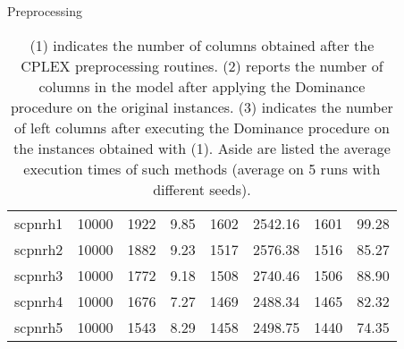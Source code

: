 \documentclass[a4paper,12pt]{mydeitesi_eng}
\begin{document}
\begin{chapter}{Preprocessing}
\begin{table}[H]
\begin{center}
\begin{tabular}{l|r||r|r||r|r||r|r}
scpnrh1 & 10000 & 1922 & 9.85 & 1602 & 2542.16 & 1601 & 99.28 \\
scpnrh2 & 10000 & 1882 & 9.23 & 1517 & 2576.38 & 1516 & 85.27 \\
scpnrh3 & 10000 & 1772 & 9.18 & 1508 & 2740.46 & 1506 & 88.90 \\
scpnrh4 & 10000 & 1676 & 7.27 & 1469 & 2488.34 & 1465 & 82.32 \\
scpnrh5 & 10000 & 1543 & 8.29 & 1458 & 2498.75 & 1440 & 74.35 \\
\end{tabular}
\end{center}
\caption{(1) indicates the number of columns obtained after the CPLEX preprocessing routines. (2) reports the number of columns in the model after applying the Dominance procedure on the original instances. (3) indicates the number of left columns after executing the Dominance procedure on the instances obtained with (1).
Aside are listed the average execution times of such methods (average on 5 runs with different seeds).}
\label{tab:PreprocessingResults}
\end{table}



\end{chapter}
\end{document}

